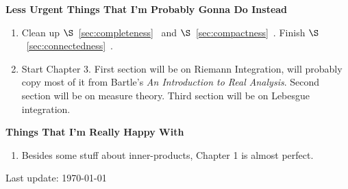 \documentclass[11pt,twoside,openany]{memoir}
\begin{document}
    \noindent \textbf{Less Urgent Things That I'm Probably Gonna Do Instead}
    \begin{enumerate}[label = (\arabic*),itemsep=1pt,topsep=3pt]
        \item Clean up $\S$~\ref{sec:completeness}~ and $\S$~\ref{sec:compactness}~. Finish $\S$~\ref{sec:connectedness}~.
        \item Start Chapter 3. First section will be on Riemann Integration, will probably copy most of it from Bartle's \textit{An Introduction to Real Analysis}. Second section will be on measure theory. Third section will be on Lebesgue integration.
    \end{enumerate}

    \noindent \textbf{Things That I'm Really Happy With}
    \begin{enumerate}[label = (\arabic*),itemsep=1pt,topsep=3pt]
        \item Besides some stuff about inner-products, Chapter 1 is almost perfect.
    \end{enumerate}


    \vfill
    \specialdate
    Last update: \today

    
    
    
    \appendix
    
\end{document}
